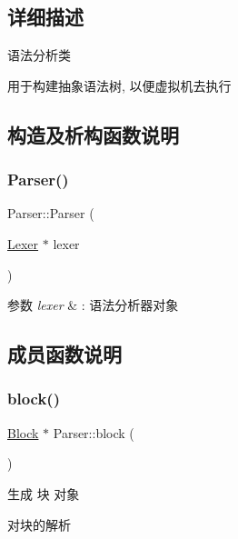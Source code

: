 \subsection{详细描述}
语法分析类 

用于构建抽象语法树, 以便虚拟机去执行 

\subsection{构造及析构函数说明}
\mbox{\label{class_parser_a25929f4bcec5c5ff010218f001203b73}} 
\subsubsection{\texorpdfstring{Parser()}{Parser()}}
{\footnotesize\ttfamily Parser\+::\+Parser (\begin{DoxyParamCaption}\item[{\hyperlink{class_lexer}{Lexer} $\ast$}]{lexer }\end{DoxyParamCaption})}


\begin{DoxyParams}{参数}
{\em lexer} & \+: 语法分析器对象 \\
\hline
\end{DoxyParams}


\subsection{成员函数说明}
\mbox{\label{class_parser_a2e96322fd6d40261ab256a726634c1b3}} 
\subsubsection{\texorpdfstring{block()}{block()}}
{\footnotesize\ttfamily \hyperlink{class_block}{Block} $\ast$ Parser\+::block (\begin{DoxyParamCaption}{ }\end{DoxyParamCaption})\hspace{0.3cm}{\ttfamily [protected]}}



生成 块 对象 

对块的解析 \mbox{\label{class_parser_a44a52c6402e86b0a200e02b516f8e9fe}} 
